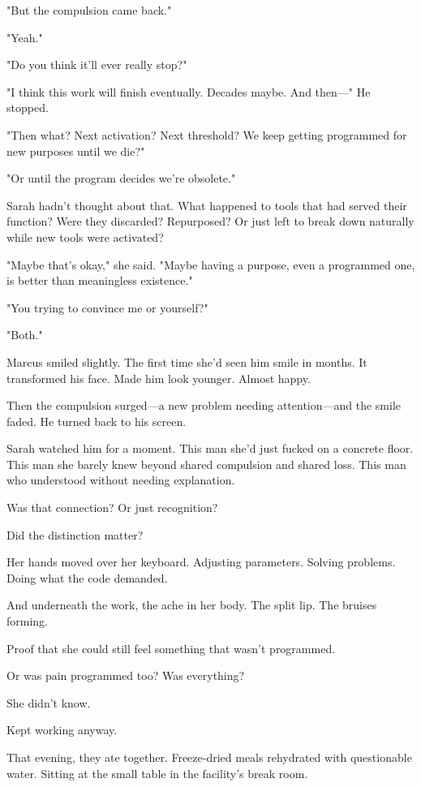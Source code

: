 "But the compulsion came back."

"Yeah."

"Do you think it'll ever really stop?"

"I think this work will finish eventually. Decades maybe. And then—" He stopped.

"Then what? Next activation? Next threshold? We keep getting programmed for new purposes until we die?"

"Or until the program decides we're obsolete."

Sarah hadn't thought about that. What happened to tools that had served their function? Were they discarded? Repurposed? Or just left to break down naturally while new tools were activated?

"Maybe that's okay," she said. "Maybe having a purpose, even a programmed one, is better than meaningless existence."

"You trying to convince me or yourself?"

"Both."

Marcus smiled slightly. The first time she'd seen him smile in months. It transformed his face. Made him look younger. Almost happy.

Then the compulsion surged—a new problem needing attention—and the smile faded. He turned back to his screen.

Sarah watched him for a moment. This man she'd just fucked on a concrete floor. This man she barely knew beyond shared compulsion and shared loss. This man who understood without needing explanation.

Was that connection? Or just recognition?

Did the distinction matter?

Her hands moved over her keyboard. Adjusting parameters. Solving problems. Doing what the code demanded.

And underneath the work, the ache in her body. The split lip. The bruises forming.

Proof that she could still feel something that wasn't programmed.

Or was pain programmed too? Was everything?

She didn't know.

Kept working anyway.

\scenebreak

That evening, they ate together. Freeze-dried meals rehydrated with questionable water. Sitting at the small table in the facility's break room.


